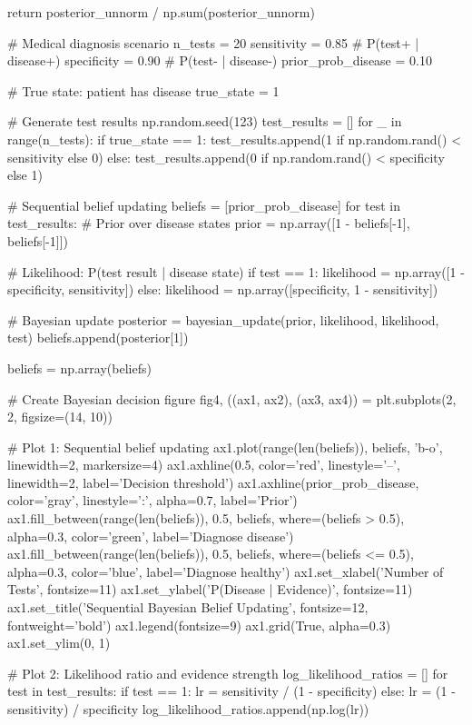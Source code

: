 \documentclass[a4paper, 11pt]{article}
\begin{document}
{{\begin{pycode}
    return posterior_unnorm / np.sum(posterior_unnorm)

# Medical diagnosis scenario
n_tests = 20
sensitivity = 0.85  # P(test+ | disease+)
specificity = 0.90  # P(test- | disease-)
prior_prob_disease = 0.10

# True state: patient has disease
true_state = 1

# Generate test results
np.random.seed(123)
test_results = []
for _ in range(n_tests):
    if true_state == 1:
        test_results.append(1 if np.random.rand() < sensitivity else 0)
    else:
        test_results.append(0 if np.random.rand() < specificity else 1)

# Sequential belief updating
beliefs = [prior_prob_disease]
for test in test_results:
    # Prior over disease states
    prior = np.array([1 - beliefs[-1], beliefs[-1]])

    # Likelihood: P(test result | disease state)
    if test == 1:
        likelihood = np.array([1 - specificity, sensitivity])
    else:
        likelihood = np.array([specificity, 1 - sensitivity])

    # Bayesian update
    posterior = bayesian_update(prior, likelihood, likelihood, test)
    beliefs.append(posterior[1])

beliefs = np.array(beliefs)

# Create Bayesian decision figure
fig4, ((ax1, ax2), (ax3, ax4)) = plt.subplots(2, 2, figsize=(14, 10))

# Plot 1: Sequential belief updating
ax1.plot(range(len(beliefs)), beliefs, 'b-o', linewidth=2, markersize=4)
ax1.axhline(0.5, color='red', linestyle='--', linewidth=2, label='Decision threshold')
ax1.axhline(prior_prob_disease, color='gray', linestyle=':', alpha=0.7, label='Prior')
ax1.fill_between(range(len(beliefs)), 0.5, beliefs, where=(beliefs > 0.5),
                  alpha=0.3, color='green', label='Diagnose disease')
ax1.fill_between(range(len(beliefs)), 0.5, beliefs, where=(beliefs <= 0.5),
                  alpha=0.3, color='blue', label='Diagnose healthy')
ax1.set_xlabel('Number of Tests', fontsize=11)
ax1.set_ylabel('P(Disease | Evidence)', fontsize=11)
ax1.set_title('Sequential Bayesian Belief Updating', fontsize=12, fontweight='bold')
ax1.legend(fontsize=9)
ax1.grid(True, alpha=0.3)
ax1.set_ylim(0, 1)

# Plot 2: Likelihood ratio and evidence strength
log_likelihood_ratios = []
for test in test_results:
    if test == 1:
        lr = sensitivity / (1 - specificity)
    else:
        lr = (1 - sensitivity) / specificity
    log_likelihood_ratios.append(np.log(lr))


\end{pycode}}}
\end{document}
